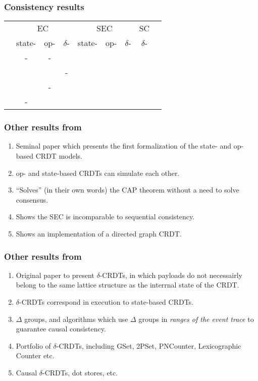 \documentclass[aspectratio=169,compress]{beamer}
\newcommand{\cmark}{\ding{51}}
\begin{document}
  \begin{frame}
    \frametitle{Consistency results}

    \begin{table}
      \begin{tabular}{rcccccccc}
        & \multicolumn{3}{c}{EC}
        & \multicolumn{3}{c}{SEC}
        & \multicolumn{1}{c}{SC} \\
        \cmidrule(lr){2-4} \cmidrule(lr){5-7} \cmidrule(lr){8-8}
          & state- & op- & $\delta$-
          & state- & op- & $\delta$-
          & $\delta$- \\
        \midrule
          \cite{shapiro11} & - & - & & \cmark & \cmark & & \\
          \cite{almeida16} & & & - & & & \cmark & \cmark   \\
          \cite{gomes17} & & - & & & \cmark\footnotemark[1] & & \\
          \cite{zeller14} & - & & & \cmark\footnotemark[2] & & & \\
      \end{tabular}
    \end{table}
  \end{frame}

  \begin{frame}
    \frametitle{Other results from~\cite{shapiro11}}
    \begin{enumerate}
      \item Seminal paper which presents the first formalization of the state-
        and op-based CRDT models.
      \item op- and state-based CRDTs can simulate each other.
      \item ``Solves'' (in their own words) the CAP theorem without a need to
        solve consensus.
      \item Shows the SEC is incomparable to sequential consistency.
      \item Shows an implementation of a directed graph CRDT.
    \end{enumerate}
  \end{frame}

  \begin{frame}
    \frametitle{Other results from~\cite{almeida16}}
    \begin{enumerate}
      \item Original paper to present $\delta$-CRDTs, in which payloads do not
        necessairly belong to the same lattice structure as the interrnal state
        of the CRDT.
      \item $\delta$-CRDTs correspond in execution to state-based CRDTs.
      \item $\Delta$ groups, and algorithms which use $\Delta$ groups in
        \textit{ranges of the event trace} to guarantee causal consistency.
      \item Portfolio of $\delta$-CRDTs, including GSet, 2PSet, PNCounter,
        Lexicographic Counter etc.
      \item Causal $\delta$-CRDTs, dot stores, etc.
    \end{enumerate}
  \end{frame}
\end{document}
